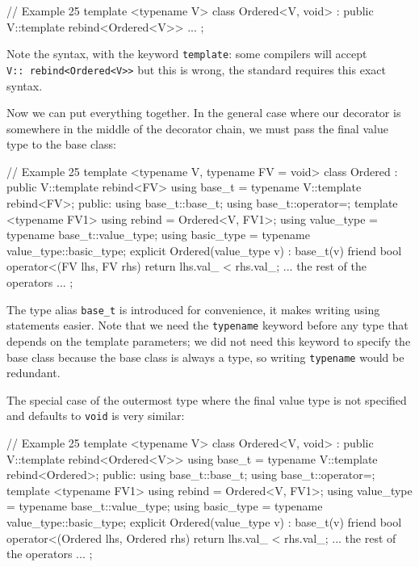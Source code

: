 \begin{code}
// Example 25
template <typename V> class Ordered<V, void> :
  public V::template rebind<Ordered<V>> { ... };
\end{code}

Note the syntax, with the keyword \texttt{template}: some compilers will accept \texttt{V::\ rebind\textless{}Ordered\textless{}V\textgreater{}\textgreater{}} but this is wrong, the standard requires this exact syntax.

Now we can put everything together. In the general case where our decorator is somewhere in the middle of the decorator chain, we must pass the final value type to the base class:

\begin{code}
// Example 25
template <typename V, typename FV = void>
class Ordered : public V::template rebind<FV> {
  using base_t = typename V::template rebind<FV>;
  public:
  using base_t::base_t;
  using base_t::operator=;
  template <typename FV1> using rebind = Ordered<V, FV1>;
  using value_type = typename base_t::value_type;
  using basic_type = typename value_type::basic_type;
  explicit Ordered(value_type v) : base_t(v) {}
  friend bool operator<(FV lhs, FV rhs) {
    return lhs.val_ < rhs.val_;
  }
  ... the rest of the operators ...
};
\end{code}

The type alias \texttt{base\_t} is introduced for convenience, it makes writing using statements easier. Note that we need the \texttt{typename} keyword before any type that depends on the template parameters; we did not need this keyword to specify the base class because the base class is always a type, so writing \texttt{typename} would be redundant.

The special case of the outermost type where the final value type is not specified and defaults to \texttt{void} is very similar:

\begin{code}
// Example 25
template <typename V> class Ordered<V, void>
  : public V::template rebind<Ordered<V>> {
  using base_t = typename V::template rebind<Ordered>;
  public:
  using base_t::base_t;
  using base_t::operator=;
  template <typename FV1> using rebind = Ordered<V, FV1>;
  using value_type = typename base_t::value_type;
  using basic_type = typename value_type::basic_type;
  explicit Ordered(value_type v) : base_t(v) {}
  friend bool operator<(Ordered lhs, Ordered rhs) {
    return lhs.val_ < rhs.val_;
  }
  ... the rest of the operators ...
};
\end{code}

